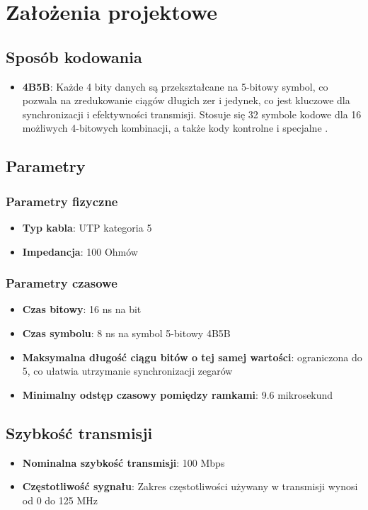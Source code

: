 \documentclass{article}
\begin{document}
\newpage

\section{Założenia projektowe}
\subsection{Sposób kodowania}
\begin{itemize}
    \item \textbf{4B5B}: Każde 4 bity danych są przekształcane na 5-bitowy symbol, co pozwala na zredukowanie ciągów długich zer i jedynek, co jest kluczowe dla synchronizacji i efektywności transmisji. Stosuje się 32 symbole kodowe dla 16 możliwych 4-bitowych kombinacji, a także kody kontrolne i specjalne \cite{patent}.

\end{itemize}
\subsection{Parametry}
\subsubsection{Parametry fizyczne}
\begin{itemize}
\item \textbf{Typ kabla}: UTP kategoria 5
\item \textbf{Impedancja}: 100 Ohmów \cite{ieee802}
\end{itemize}

\subsubsection{Parametry czasowe}
\begin{itemize}
    \item \textbf{Czas bitowy}: 16 ns na bit
    \item \textbf{Czas symbolu}: 8 ns na symbol 5-bitowy 4B5B
    \item \textbf{Maksymalna długość ciągu bitów o tej samej wartości}: ograniczona do 5, co ułatwia utrzymanie synchronizacji zegarów
    \item \textbf{Minimalny odstęp czasowy pomiędzy ramkami}: 9.6 mikrosekund \cite{ieee802}
\end{itemize}

\subsection{Szybkość transmisji}
\begin{itemize}
    \item \textbf{Nominalna szybkość transmisji}: 100 Mbps
    \item \textbf{Częstotliwość sygnału}: Zakres częstotliwości używany w transmisji wynosi od 0 do 125 MHz \cite{ieee802}
\end{itemize}
\end{document}
